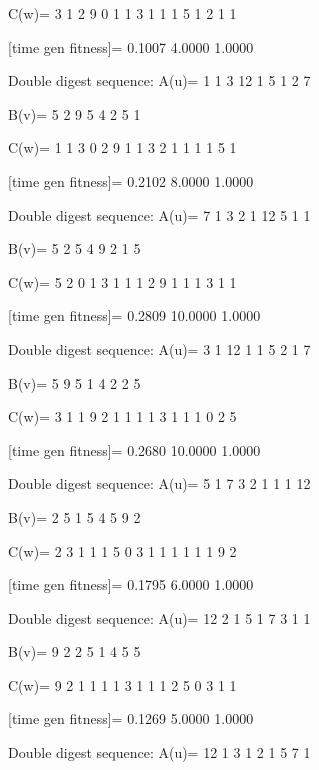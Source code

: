 C(w)=
     3     1     2     9     0     1     1     3     1     1     1     5     1     2     1     1

[time gen fitness]=
    0.1007    4.0000    1.0000

Double digest sequence:
A(u)=
     1     1     3    12     1     5     1     2     7

B(v)=
     5     2     9     5     4     2     5     1

C(w)=
     1     1     3     0     2     9     1     1     3     2     1     1     1     1     5     1

[time gen fitness]=
    0.2102    8.0000    1.0000

Double digest sequence:
A(u)=
     7     1     3     2     1    12     5     1     1

B(v)=
     5     2     5     4     9     2     1     5

C(w)=
     5     2     0     1     3     1     1     1     2     9     1     1     1     3     1     1

[time gen fitness]=
    0.2809   10.0000    1.0000

Double digest sequence:
A(u)=
     3     1    12     1     1     5     2     1     7

B(v)=
     5     9     5     1     4     2     2     5

C(w)=
     3     1     1     9     2     1     1     1     1     3     1     1     1     0     2     5

[time gen fitness]=
    0.2680   10.0000    1.0000

Double digest sequence:
A(u)=
     5     1     7     3     2     1     1     1    12

B(v)=
     2     5     1     5     4     5     9     2

C(w)=
     2     3     1     1     1     5     0     3     1     1     1     1     1     1     9     2

[time gen fitness]=
    0.1795    6.0000    1.0000

Double digest sequence:
A(u)=
    12     2     1     5     1     7     3     1     1

B(v)=
     9     2     2     5     1     4     5     5

C(w)=
     9     2     1     1     1     1     3     1     1     1     2     5     0     3     1     1

[time gen fitness]=
    0.1269    5.0000    1.0000

Double digest sequence:
A(u)=
    12     1     3     1     2     1     5     7     1

